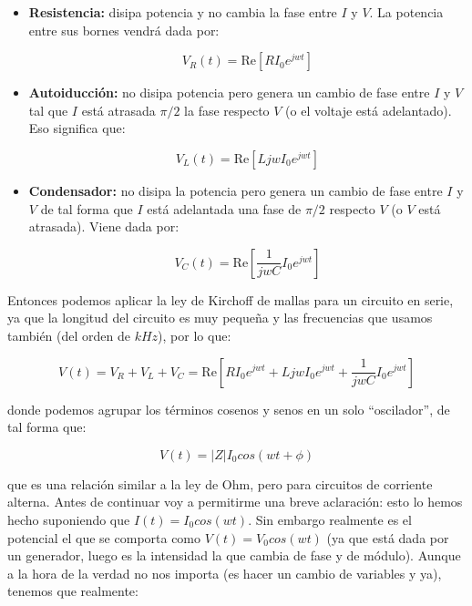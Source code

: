\documentclass[12pt,a4paper]{article}
\newcommand{\ccorchetes}[1]{\left[ #1  \right]}
\newcommand{\Real}{\mathrm{Re} }
\begin{document}
\begin{itemize}
\item \textbf{Resistencia:} disipa potencia y no cambia la fase entre $I$ y $V$. La potencia entre sus bornes vendrá dada por:

\begin{equation}
V_R(t) = \Real [R I_0 e^{jwt}]
\end{equation}

\item \textbf{Autoiducción:} no disipa potencia pero genera un cambio de fase entre $I$ y $V$ tal que $I$ está atrasada $\pi/2$ la fase respecto $V$ (o el voltaje está adelantado). Eso significa que:

\begin{equation}
V_L (t) = \Real [L j w I_0 e^{jwt}] 
\end{equation}


\item \textbf{Condensador:} no disipa la potencia pero genera un cambio de fase entre           $I$ y $V$ de tal forma que $I$ está adelantada una fase de $\pi/2$ respecto $V$ (o $V$ está atrasada). Viene dada por:

\begin{equation}
V_C (t) = \Real \ccorchetes{ \dfrac{1}{jwC} I_0 e^{jwt} }
\end{equation}

\end{itemize}


Entonces podemos aplicar la ley de Kirchoff de mallas para un circuito en serie, ya que la longitud del circuito es muy pequeña y las frecuencias que usamos también (del orden de $kHz$), por lo que:

\begin{equation}
V(t)  = V_R + V_L + V_C = \Real \ccorchetes{R I_0 e^{jwt} + L j w I_0 e^{jwt} +\dfrac{1}{jwC} I_0 e^{jwt} } 
\end{equation} 

donde podemos agrupar los términos cosenos y senos en un solo ``oscilador'', de tal forma que: 

\begin{equation}
V(t) = |Z| I_0 cos(wt+ \phi) \label{Ec:leyOhmCA}
\end{equation}

que es una relación similar a la ley de Ohm, pero para circuitos de corriente alterna. Antes de continuar voy a permitirme una breve aclaración: esto lo hemos hecho suponiendo que $I(t)=I_0 cos(wt)$. Sin embargo realmente es el potencial el que se comporta como $V(t)=V_0 cos(wt)$ (ya que está dada por un generador, luego es la intensidad la que cambia de fase y de módulo). Aunque a la hora de la verdad no nos importa (es hacer un cambio de variables y ya), tenemos que realmente:
\end{document}
